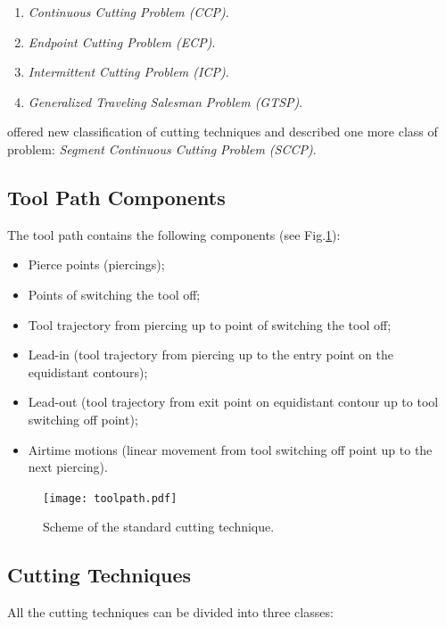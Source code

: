 \documentclass{../download/tPRS2e}
\begin{document}
\begin{enumerate}
\item \textit{Continuous Cutting Problem (CCP)}.
\item \textit{Endpoint Cutting Problem (ECP)}.
\item \textit{Intermittent Cutting Problem (ICP)}. 
\item \textit{Generalized Traveling Salesman Problem (GTSP)}.
\end{enumerate}

\cite{petunin_modeling_2015} offered new classification of cutting techniques and described one more class of problem:
\textit{Segment Continuous Cutting Problem (SCCP)}.

\subsection{Tool Path Components}

The tool path contains the following components (see Fig.\ref{toolpath}):

\begin{itemize}
\item Pierce points (piercings);
\item Points of switching the tool off;
\item Tool trajectory from piercing up to point of switching the tool off; 
\item Lead-in (tool trajectory from piercing up to the entry point on the equidistant contours); 
\item Lead-out (tool trajectory from exit point on equidistant contour up to tool switching off point); 
\item Airtime motions (linear movement from tool switching off point up to the next piercing).
\end{itemize}

\begin{figure}
\begin{center}
\texttt{[image: toolpath.pdf]}
\caption{Scheme of the standard cutting technique.} \label{toolpath}
\end{center}
\end{figure}

\subsection{Cutting Techniques}

All the cutting techniques can be divided into three classes:
\end{document}
